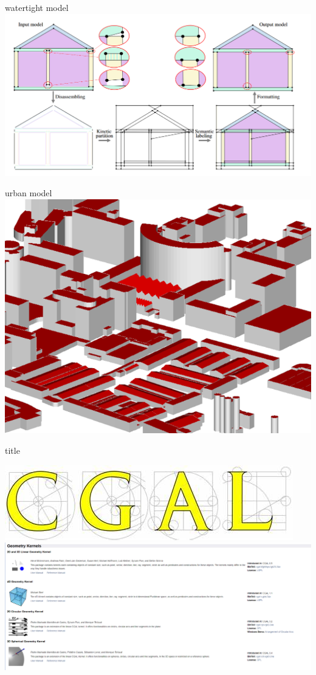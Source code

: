 \documentclass[10pt]{beamer}
\begin{document}
\begin{frame}[plain]{watertight model}
    \includegraphics[scale = 0.37]{../../images/example_algorithm_2.png}
\end{frame}
\begin{frame}[plain]{urban model}
    \includegraphics[scale = 0.60]{../../images/example_algorithm_3.png}
\end{frame}
\begin{frame}{title}
    
    \includegraphics[scale = 0.2]{../../images/CGAL_logo.png}
    \includegraphics[scale =   0.3 ]{../../images/exemple.png}

\end{frame}
\end{document}
